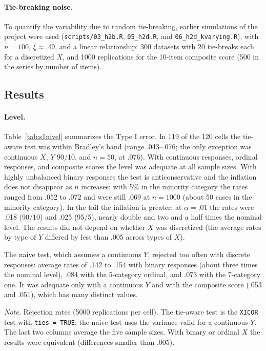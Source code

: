 \documentclass[man,mask,donotrepeattitle,floatsintext]{apa7}
\begin{document}
\paragraph{Tie-breaking noise.} To quantify the variability due to random tie-breaking, earlier simulations of the project were used (\texttt{scripts/03\_h2b.R}, \texttt{05\_h2d.R}, and \texttt{06\_h2d\_kvarying.R}), with $n=100$, $\xi\approx .49$, and a linear relationship: 300 datasets with 20 tie-breaks each for a discretized $X$, and 1000 replications for the 10-item composite score (500 in the series by number of items).

\subsection{Results}

\paragraph{Level.} Table~\ref{tab:s1nivel} summarizes the Type I error. In 119 of the 120 cells the tie-aware test was within Bradley's band (range .043--.076; the only exception was continuous $X$, $Y$ 90/10, and $n=50$, at .076). With continuous responses, ordinal responses, and composite scores the level was adequate at all sample sizes. With highly unbalanced binary responses the test is anticonservative and the inflation does not disappear as $n$ increases: with 5\% in the minority category the rates ranged from .052 to .072 and were still .069 at $n=1000$ (about 50 cases in the minority category). In the tail the inflation is greater: at $\alpha=.01$ the rates were .018 (90/10) and .025 (95/5), nearly double and two and a half times the nominal level. The results did not depend on whether $X$ was discretized (the average rates by type of $Y$ differed by less than .005 across types of $X$).

The naive test, which assumes a continuous $Y$, rejected too often with discrete responses: average rates of .142 to .154 with binary responses (about three times the nominal level), .084 with the 5-category ordinal, and .073 with the 7-category one. It was adequate only with a continuous $Y$ and with the composite score (.053 and .051), which has many distinct values.

\begin{table}
\caption{Type I Error of the $\xi_n$ Test Under Independence, With Continuous $X$}
\label{tab:s1nivel}
\begin{threeparttable}
\small
\footnotesize\setlength{\tabcolsep}{3pt}

\begin{tablenotes}[flushleft]
\small
\item \textit{Note.} Rejection rates (5000 replications per cell). The tie-aware test is the \texttt{XICOR} test with \texttt{ties = TRUE}; the naive test uses the variance valid for a continuous $Y$. The last two columns average the five sample sizes. With binary or ordinal $X$ the results were equivalent (differences smaller than .005).
\end{tablenotes}
\end{threeparttable}
\end{table}
\end{document}
